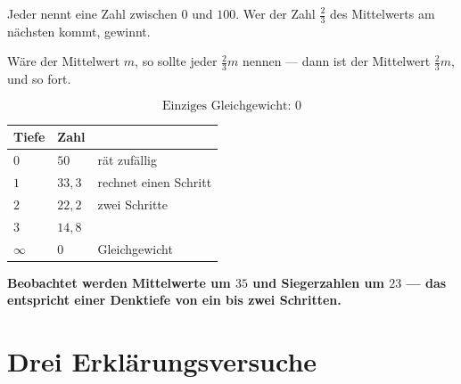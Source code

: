 \begin{merksatz}
Jeder nennt eine Zahl zwischen $0$ und $100$. Wer der Zahl $\tfrac23$ des Mittelwerts am nächsten kommt, gewinnt.

Wäre der Mittelwert $m$, so sollte jeder $\tfrac23 m$ nennen --- dann ist der Mittelwert $\tfrac23 m$, und so fort.

\[ \text{Einziges Gleichgewicht: } 0 \]

\begin{center}
{\small
\renewcommand{\arraystretch}{1.48}
\begin{tabular}{@{}P{2.0cm}P{2.0cm}P{3.2cm}@{}}
\toprule
\textbf{Tiefe} & \textbf{Zahl} & \\
\midrule
$0$ & $50$ & rät zufällig\\
$1$ & $33{,}3$ & rechnet einen Schritt\\
$2$ & $22{,}2$ & zwei Schritte\\
$3$ & $14{,}8$ & \\
$\infty$ & $0$ & Gleichgewicht\\
\bottomrule
\end{tabular}}
\end{center}

\begin{center}
\begin{minipage}{0.9\textwidth}
\textbf{Beobachtet werden Mittelwerte um $35$ und Siegerzahlen um $23$ --- das entspricht einer Denktiefe von ein bis zwei Schritten.}
\end{minipage}
\end{center}

\begin{center}
\begin{minipage}{0.88\textwidth}
\end{minipage}
\end{center}
\end{merksatz}

\section{Drei Erklärungsversuche}

